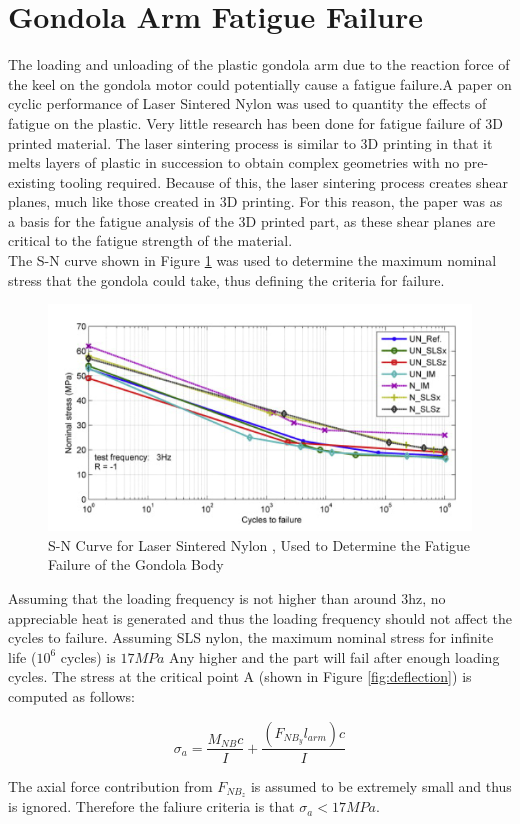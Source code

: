 \documentclass[../main.tex]{subfiles}
\begin{document}
\section{Gondola Arm Fatigue Failure}
The loading and unloading of the plastic gondola arm due to the reaction force of the keel on the gondola motor could potentially cause a fatigue failure.A paper on cyclic performance of Laser Sintered Nylon \cite{fatiguePlastic} was used to quantity the effects of fatigue on the plastic. Very little research has been done for fatigue failure of 3D printed material. The laser sintering process is similar to 3D printing in that it melts layers of plastic in succession to obtain complex geometries with no pre-existing tooling required. Because of this, the laser sintering process creates shear planes, much like those created in 3D printing. For this reason, the paper was as a basis for the fatigue analysis of the 3D printed part, as these shear planes are critical to the fatigue strength of the material. \\

The S-N curve shown in Figure \ref{fig:snCurve} was used to determine the maximum nominal stress that the gondola could take, thus defining the criteria for failure.

\begin{figure}[H]
	\centering
	\includegraphics[width=.8\linewidth]{img/gondola/snCurve.PNG}
	\caption{S-N Curve for Laser Sintered Nylon \cite{fatiguePlastic}, Used to Determine the Fatigue Failure of the Gondola Body}
	\label{fig:snCurve}
\end{figure}

Assuming that the loading frequency is not higher than around 3hz, no appreciable heat is generated and thus the loading frequency should not affect the cycles to failure. Assuming SLS nylon, the maximum nominal stress for infinite life ($10^6$ cycles) is $17MPa$ Any higher and the part will fail after enough loading cycles. The stress at the critical point A (shown in Figure \ref{fig:deflection}) is computed as follows:

\begin{equation}
	\sigma_a = \dfrac{M_{NB}c}{I} +\dfrac{(F_{NB_{y}}l_{arm})c}{I}
\end{equation}

The axial force contribution from $F_{NB_{z}}$ is assumed to be extremely small and thus is ignored. Therefore the faliure criteria is that $\sigma _a < 17MPa$.
\end{document}
